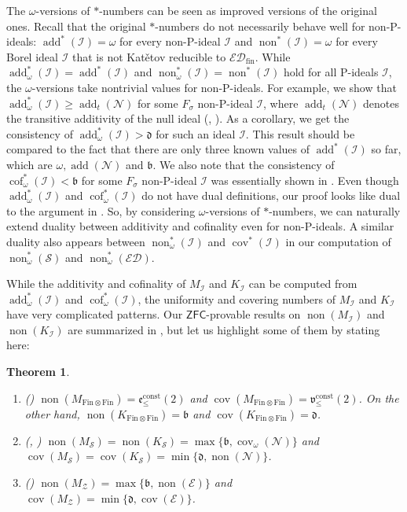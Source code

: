\documentclass[a4paper,12pt]{amsart}
\newcounter{enuAlph}
\newtheorem{teorema}[enuAlph]{Theorem}
\theoremstyle{definition}
\numberwithin{thm}{section}
\numberwithin{equation}{section}
\newcommand{\bb}{\mathfrak{b}}
\newcommand{\dd}{\mathfrak{d}}
\newcommand{\ee}{\mathfrak{e}}
\newcommand{\n}{\mathcal{N}}
\DeclareMathOperator{\non}{non}
\DeclareMathOperator{\cov}{cov}
\DeclareMathOperator{\add}{add}
\DeclareMathOperator{\cof}{cof}
\newcommand{\ed}{\mathcal{ED}}
\newcommand{\I}{\mathscr{I}}
\newcommand{\edfin}{\mathcal{ED}_\mathrm{fin}}
\newcommand{\finfin}{\mathrm{Fin}\otimes\mathrm{Fin}}
\newcommand{\Z}{\mathcal{Z}}
\newcommand{\Solecki}{\mathcal{S}}
\newcommand{\vv}{\mathfrak{v}}
\begin{document}
    The $\omega$-versions of $*$-numbers can be seen as improved versions of the original ones. Recall that the original $*$-numbers do not necessarily behave well for non-P-ideals: $\add^*(\I) = \omega$ for every non-P-ideal $\I$ and $\non^*(\I) = \omega$ for every Borel ideal $\I$ that is not Kat\v{e}tov reducible to $\edfin$. While $\add^*_\omega(\I) = \add^*(\I)$ and $\non^*_\omega(\I) = \non^*(\I)$ hold for all P-ideals $\I$, the $\omega$-versions take nontrivial values for non-P-ideals. For example, we show that $\add^*_\omega(\I)\geq\add_t(\n)$ for some $F_\sigma$ non-P-ideal $\I$, where $\add_t(\n)$ denotes the transitive additivity of the null ideal (, ). As a corollary, we get the consistency of $\add^*_\omega(\I)>\dd$ for such an ideal $\I$. This result should be compared to the fact that there are only three known values of $\add^*(\I)$ so far, which are $\omega, \add(\n)$ and $\bb$. We also note that the consistency of $\cof^*_\omega(\I)<\bb$ for some $F_\sigma$ non-P-ideal $\I$ was essentially shown in \cite{HRRZ14}. Even though $\add^*_\omega(\I)$ and $\cof^*_\omega(\I)$ do not have dual definitions, our proof looks like dual to the argument in \cite{HRRZ14}. So, by considering $\omega$-versions of $*$-numbers, we can naturally extend duality between additivity and cofinality even for non-P-ideals. A similar duality also appears between $\non^*_\omega(\I)$ and $\cov^*(\I)$ in our computation of $\non^*_\omega(\Solecki)$ and $\non^*_\omega(\ed)$.

    While the additivity and cofinality of $M_\I$ and $K_\I$ can be computed from $\add^*_\omega(\I)$ and $\cof^*_\omega(\I)$, the uniformity and covering numbers of $M_\I$ and $K_\I$ have very complicated patterns. Our $\mathsf{ZFC}$-provable results on $\non(M_\I)$ and $\non(K_\I)$ are summarized in , but let us highlight some of them by stating here:
    
    \begin{teorema}\label{mainthm:comp_non_MI}\leavevmode
        \begin{enumerate}
            \item \textnormal{()} $\non(M_{\finfin}) = \ee^{\mathrm{const}}_{\leq}(2)$ and $\cov(M_{\finfin}) = \vv^{\mathrm{const}}_{\leq}(2)$.
            On the other hand, $\non(K_{\finfin}) = \bb$ and $\cov(K_{\finfin}) = \dd$.
            \item \textnormal{(, )} $\non(M_\Solecki) = \non(K_\Solecki) = \max\{\bb, \cov_\omega(\n)\}$ and $\cov(M_\Solecki) = \cov(K_\Solecki) = \min\{\dd, \non(\n)\}$.
            \item \textnormal{()} $\non(M_\Z) = \max\{\bb, \non(\mathcal{E})\}$ and $\cov(M_\Z) = \min\{\dd, \cov(\mathcal{E})\}$.
        \end{enumerate}
    \end{teorema}
    
\end{document}
